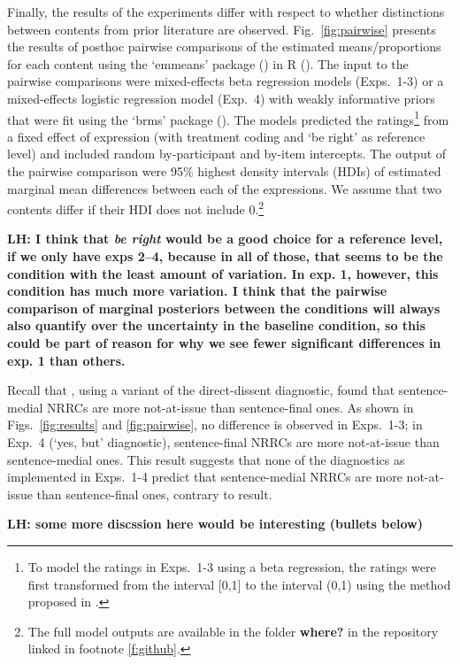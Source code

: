 \documentclass[times,linguex,xcolor]{glossa}
\newcommand{\lh}[1]{\textbf{\color{Cerulean}LH: #1}}
\begin{document}
  Finally, the results of the experiments differ with respect to whether distinctions between contents from prior literature are observed. Fig.~\ref{fig:pairwise} presents the results of posthoc pairwise comparisons of the estimated means/proportions for each content using the `emmeans' package (\citealt{emmeans}) in R (\citealt{r}). The input to the pairwise comparisons were mixed-effects beta regression models (Exps.~1-3) or a mixed-effects logistic regression model (Exp.~4) with weakly informative priors that were fit using the `brms' package (\citealt{buerkner2017}). The models predicted the  ratings\footnote{To model the ratings in Exps.~1-3 using a beta regression, the ratings were first transformed from the interval [0,1] to the interval (0,1) using the method proposed in \citealt{smithson-verkuilen2006}.} from a fixed effect of expression (with treatment coding and `be right' as reference level) and included random by-participant and by-item intercepts. The output of the pairwise comparison were 95\% highest density intervals (HDIs) of estimated marginal mean differences between each of the expressions. We assume that two contents differ if their HDI does not include 0.\footnote{The full model outputs are available in the folder {\bf where?} in the repository linked in footnote \ref{f:github}.}

  \lh{I think that \emph{be right} would be a good choice for a reference level, if we only have exps 2--4, because in all of those, that seems to be the condition with the least amount of variation. In exp. 1, however, this condition has much more variation. I think that the pairwise comparison of marginal posteriors between the conditions will always also quantify over the uncertainty in the baseline condition, so this could be part of reason for why we see fewer significant differences in exp. 1 than others.}

  Recall that \citealt{syrett_experimental_2015}, using a variant of the direct-dissent diagnostic, found that sentence-medial NRRCs are more not-at-issue than sentence-final ones. As shown in Figs.~\ref{fig:results} and \ref{fig:pairwise}, no difference is observed in Exps.~1-3; in Exp.~4 (`yes, but' diagnostic), sentence-final NRRCs are more not-at-issue than sentence-medial ones.  This result suggests that none of the diagnostics as implemented in Exps.~1-4 predict that sentence-medial NRRCs are more not-at-issue than sentence-final ones, contrary to  result.

  \lh{some more discssion here would be interesting (bullets below)}
\end{document}
